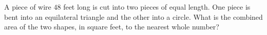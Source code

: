 A piece of wire $48$ feet long is cut into two pieces of equal length. One piece is bent into an equilateral triangle and the other into a circle. What is the combined area of the two shapes, in square feet, to the nearest whole number?
